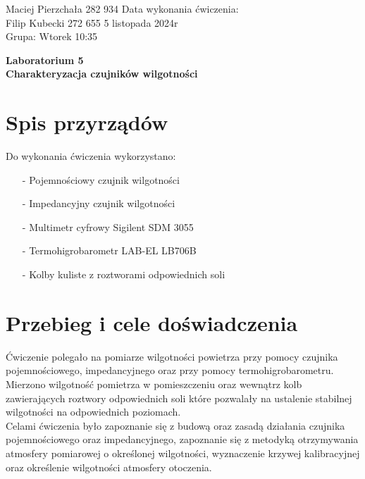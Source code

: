\documentclass[11pt]{article}
\begin{document}
    \begin{flushleft}
        Maciej Pierzchała 282 934 \hfill Data wykonania ćwiczenia:\\
        Filip Kubecki 272 655 \hfill 5 listopada 2024r\\
        Grupa: Wtorek 10:35 \\
    \end{flushleft}
    \begin{center}
        \Large\textbf{Laboratorium 5}\\
        \textbf{Charakteryzacja czujników wilgotności}
    \end{center}
    \hfill
    \section{Spis przyrządów}
    \par{
        Do wykonania ćwiczenia wykorzystano:
        \begin{itemize}
            \setlength\itemsep{0em}
            \item[-] Pojemnościowy czujnik wilgotności
            \item[-] Impedancyjny czujnik wilgotności
            \item[-] Multimetr cyfrowy Sigilent SDM 3055
            \item[-] Termohigrobarometr LAB-EL LB706B
            \item[-] Kolby kuliste z roztworami odpowiednich soli
        \end{itemize}
    }
    \section{Przebieg i cele doświadczenia}
    \par Ćwiczenie polegało na pomiarze wilgotności powietrza przy pomocy czujnika pojemnościowego, impedancyjnego oraz
    przy pomocy termohigrobarometru. Mierzono wilgotność pomietrza w pomieszczeniu oraz wewnątrz kolb zawierających roztwory
    odpowiednich soli które pozwalały na ustalenie stabilnej wilgotności na odpowiednich poziomach.\\
    \indent Celami ćwiczenia było zapoznanie się z budową oraz zasadą działania czujnika pojemnościowego oraz impedancyjnego,
    zapoznanie się z metodyką otrzymywania atmosfery pomiarowej o określonej wilgotności, wyznaczenie krzywej kalibracyjnej oraz określenie
    wilgotności atmosfery otoczenia.
\end{document}

